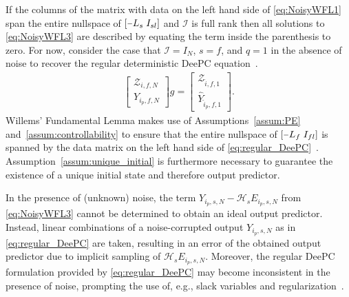 If the columns of the matrix with data on the left hand side of \eqref{eq:NoisyWFL1} span the entire nullspace of $\left[\shortminus L_s\;I_{sl}\right]$ and $\mathcal{I}$ is full rank then all solutions to \eqref{eq:NoisyWFL3} are described by equating the term inside the parenthesis to zero. For now, consider the case that $\mathcal{I}=I_N$, $s=f$, and $q=1$ in the absence of noise to recover the regular deterministic \ac{DeePC} equation~\citep{Coulson2019}. %
\begin{align}\label{eq:regular_DeePC}
    \begin{bmatrix}
        \mathcal{Z}_{i,f,N}\\
        Y_{i_p,f,N}
    \end{bmatrix}g=%
    \begin{bmatrix}
        \mathcal{Z}_{\hat{i},f,1}\\
        \widehat{Y}_{\hat{i}_p,f,1}
    \end{bmatrix}.
\end{align}
Willems' Fundamental Lemma makes use of Assumptions~\ref{assum:PE} and~\ref{assum:controllability} to ensure that the entire nullspace of $\left[\shortminus L_f\;I_{fl}\right]$ is spanned by the data matrix on the left hand side of \eqref{eq:regular_DeePC}~\citep{Willems2005}. Assumption~\ref{assum:unique_initial} is furthermore necessary to guarantee the existence of a unique initial state and therefore output predictor. %

In the presence of (unknown) noise, the term $Y_{i_p,s,N}-\mathcal{H}_s E_{i_p,s,N}$ from \eqref{eq:NoisyWFL3} cannot be determined to obtain an ideal output predictor. Instead, linear combinations of a noise-corrupted output $Y_{i_p,s,N}$ as in \eqref{eq:regular_DeePC} are taken, resulting in an error of the obtained output predictor due to implicit sampling of $\mathcal{H}_s E_{i_p,s,N}$. Moreover, the regular \ac{DeePC} formulation provided by \eqref{eq:regular_DeePC} may become inconsistent in the presence of noise, prompting the use of, e.g., slack variables and regularization~\citep{Coulson2019}.
%
